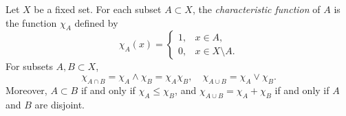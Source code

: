 Let $X$ be a fixed set. For each subset $A \subset X$, the \textit{characteristic function} of $A$ is the function $\chi_A$ defined by
$$\chi_A(x) = \begin{cases} 1, & x \in A, \\ 0, & x \in X \setminus A. \end{cases}$$
For subsets $A, B \subset X$,
$$\chi_{A \cap B} = \chi_A \wedge \chi_B = \chi_A \chi_B, \quad \chi_{A \cup B} = \chi_A \vee \chi_B.$$
Moreover, $A \subset B$ if and only if $\chi_A \leq \chi_B$, and $\chi_{A \cup B} = \chi_A + \chi_B$ if and only if $A$ and $B$ are disjoint.
